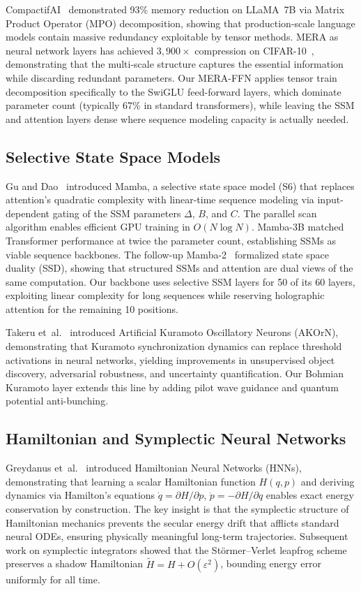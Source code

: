 \documentclass[11pt,a4paper,twocolumn]{article}
\begin{document}
CompactifAI~\cite{compactifai2024} demonstrated 93\% memory reduction on LLaMA~7B via Matrix Product Operator (MPO) decomposition, showing that production-scale language models contain massive redundancy exploitable by tensor methods.
MERA as neural network layers has achieved $3{,}900\times$ compression on CIFAR-10~\cite{mera_compact}, demonstrating that the multi-scale structure captures the essential information while discarding redundant parameters.
Our MERA-FFN applies tensor train decomposition specifically to the SwiGLU feed-forward layers, which dominate parameter count (typically 67\% in standard transformers), while leaving the SSM and attention layers dense where sequence modeling capacity is actually needed.

\subsection{Selective State Space Models}

Gu and Dao~\cite{gu2023mamba} introduced Mamba, a selective state space model (S6) that replaces attention's quadratic complexity with linear-time sequence modeling via input-dependent gating of the SSM parameters $\Delta$, $B$, and $C$.
The parallel scan algorithm enables efficient GPU training in $O(N \log N)$.
Mamba-3B matched Transformer performance at twice the parameter count, establishing SSMs as viable sequence backbones.
The follow-up Mamba-2~\cite{mamba2_2024} formalized state space duality (SSD), showing that structured SSMs and attention are dual views of the same computation.
Our backbone uses selective SSM layers for 50 of its 60 layers, exploiting linear complexity for long sequences while reserving holographic attention for the remaining 10 positions.

Takeru et~al.~\cite{akorn2025} introduced Artificial Kuramoto Oscillatory Neurons (AKOrN), demonstrating that Kuramoto synchronization dynamics can replace threshold activations in neural networks, yielding improvements in unsupervised object discovery, adversarial robustness, and uncertainty quantification.
Our Bohmian Kuramoto layer extends this line by adding pilot wave guidance and quantum potential anti-bunching.

\subsection{Hamiltonian and Symplectic Neural Networks}

Greydanus et~al.~\cite{greydanus2019} introduced Hamiltonian Neural Networks (HNNs), demonstrating that learning a scalar Hamiltonian function $H(q,p)$ and deriving dynamics via Hamilton's equations $\dot{q}=\partial H/\partial p$, $\dot{p}=-\partial H/\partial q$ enables exact energy conservation by construction.
The key insight is that the symplectic structure of Hamiltonian mechanics prevents the secular energy drift that afflicts standard neural ODEs, ensuring physically meaningful long-term trajectories.
Subsequent work on symplectic integrators showed that the St\"ormer--Verlet leapfrog scheme preserves a shadow Hamiltonian $\tilde{H} = H + O(\varepsilon^2)$, bounding energy error uniformly for all time.
\end{document}
